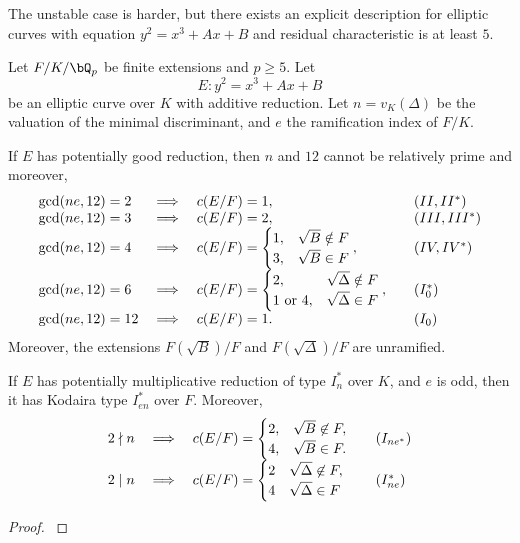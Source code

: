The unstable case is harder, but there exists an explicit description for elliptic curves with equation $y^2=x^3+Ax+B$ and residual characteristic is at least $5$. 

\begin{lemma}\label{lem_add_tam}
    Let $F /K / \bQ_p$ be finite extensions and $p \geq 5$. Let 
    $$E:  y^2 = x^3 + Ax + B$$
    be an elliptic curve over $K$ with additive reduction. Let $n=v_K(\Delta)$ be the valuation of the minimal discriminant, and $e$ the ramification index of $F/K$.

    If $E$ has potentially good reduction, then $n$ and $12$ cannot be relatively prime and moreover,
        \[
        \begin{array}{l l l l}
            \gcd(ne, 12) = 2 & \implies & c(E / F) = 1, & \quad (II, II^*) \\
            \gcd(ne, 12) = 3 & \implies & c(E / F) = 2, & \quad (III, III^*) \\
            \gcd(ne, 12) = 4 & \implies & c(E / F) = \begin{cases} 1, & \sqrt{B} \notin F
                                \\ 3, & \sqrt{B} \in F \end{cases}, & \quad (IV, IV^*) \\
            \gcd(ne, 12) = 6 & \implies & c(E / F) = \begin{cases} 2, & \sqrt{\Delta} \notin F
                \\ 1 \ \text{or} \ 4, & \sqrt{\Delta} \in F \end{cases}, & \quad (I_0^*) \\
            \gcd(ne, 12) = 12 & \implies & c(E / F) = 1. & \quad (I_0)
        \end{array}
        \]
    Moreover, the extensions $F\left(\sqrt{B}\right) / F$ and $F\left(\sqrt{\Delta}\right) / F$ are unramified.

    If $E$ has potentially multiplicative reduction of type $I_n^*$ over $K$, and $e$ is odd, then it has Kodaira type $I_{en}^*$ over $F$. Moreover, 
    \[
        \begin{array}{l l l l}
        2 \nmid n & \implies & c(E / F) = \begin{cases} 2, & \sqrt{B} \not\in F, \\ 4, & \sqrt{B} \in F. \end{cases} & \quad (I_{ne^*}) \\
        2 \mid n & \implies & c(E / F) = \begin{cases} 2 & \sqrt{\Delta} \not\in F, \\ 4 & \sqrt{\Delta} \in F \end{cases} & \quad ({I_{ne}^*})   
        \end{array} 
    \]
\end{lemma}

\begin{proof}
    \cite[Lemma 3.22]{reg-const}
\end{proof}

